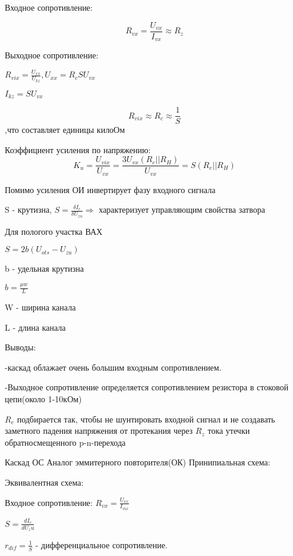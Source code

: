 Входное сопротивление:

$$
R_{vx}=\frac{U_{vx}}{I_{vx}}\approx R_z
$$

Выходное сопротивление:

$R_{vix}=\frac{U_{xx}}{U_{kz}},   U_{xx}=R_cSU_{vx}$

$I_{kz}=SU_{vx}$

$$
R_{vix}\approx R_c\approx \frac1S
$$,что составляет единицы килоОм

Коэффициент усиления по напряжению:
$$
K_u=\frac{U_{vix}}{U_{vx}}=\frac{3U_{vx}(R_c||R_H)}{U_{vx}}=S(R_c||R_H)
$$

Помимо усиления ОИ инвертирует фазу входного сигнала

S - крутизна, $S=\frac{\delta I_c}{\delta U_{zu}}\Rightarrow$ характеризует управляющим свойства затвора

Для пологого участка ВАХ

$S=2b(U_{ots}-U_{zu})$

b - удельная крутизна

$b=\frac{\mu w}{L}$

W - ширина канала

L - длина канала

Выводы:

-каскад облажает очень большим входным сопротивлением.

-Выходное сопротивление определяется сопротивлением резистора в стоковой цепи(около 1-10кОм)

$R_e$ подбирается  так, чтобы не шунтировать входной сигнал и не создавать заметного падения напряжения от протекания через $R_z$ тока утечки обратносмещенного p-n-перехода

Каскад ОС
Аналог эммитерного повторителя(ОК)
Принипиальная схема:
\begin{center}
	\begin{figure}[h!]
	\end{figure}
\end{center}
\pagebreak
Эквивалентная схема:
\begin{center}
	\begin{figure}[h!]
	\end{figure}
\end{center}

Входное сопротивление:
$R_{vx}=\frac{U_{vx}}{I_{vix}}$

$S=\frac{dI_c}{dU_zu}$

$r_{dif}=\frac1S$ - дифференциальное сопротивление.


